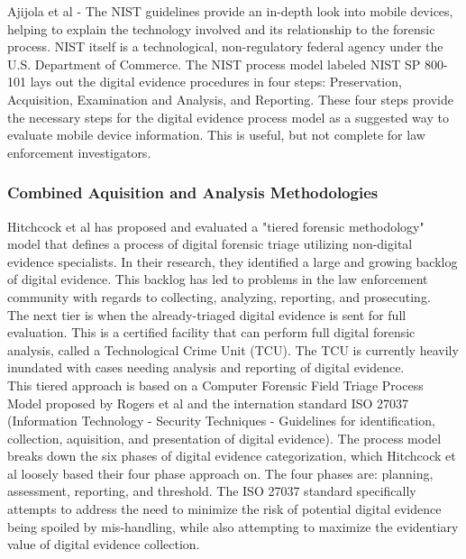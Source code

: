 \documentclass[12pt]{article}
\begin{document}
Ajijola et al\cite{ajijola2014review} - The NIST guidelines provide an in-depth look into mobile devices, helping to explain the technology involved and its
relationship to the forensic process.  NIST itself is a technological, non-regulatory federal agency under the U.S.
Department of Commerce.  The NIST process model labeled NIST SP 800-101 lays out the digital evidence procedures in
four steps: Preservation, Acquisition, Examination and Analysis, and Reporting.  These four steps provide the
necessary steps for the digital evidence process model as a suggested way to evaluate mobile device information.  This
is useful, but not complete for law enforcement investigators.\\

\subsubsection{Combined Aquisition and Analysis Methodologies}
Hitchcock et al\cite{hitchcock2016tiered} has proposed and evaluated a "tiered forensic methodology" model that defines
a process of digital forensic triage utilizing non-digital evidence specialists.  In their research, they identified
a large and growing backlog of digital evidence.  This backlog has led to problems in the law enforcement community
with regards to collecting, analyzing, reporting, and prosecuting.\\

The next tier is when the already-triaged digital evidence is sent for full evaluation.  This is a certified facility
that can perform full digital forensic analysis, called a Technological Crime Unit (TCU).  The TCU is currently
heavily inundated with cases needing analysis and reporting of digital evidence.\\

This tiered approach is based on a Computer Forensic Field Triage Process Model proposed by Rogers et al
\cite{rogers2006computer} and the internation standard ISO 27037 (Information Technology - Security Techniques - 
Guidelines for identification, collection, aquisition, and presentation of digital evidence). The process model 
breaks down the six phases of digital evidence categorization, which Hitchcock et al\cite{hitchcock2016tiered} loosely
based their four phase approach on.  The four phases are: planning, assessment, reporting, and threshold.  The ISO
27037 standard specifically attempts to address the need to minimize the risk of potential digital evidence being
spoiled by mis-handling, while also attempting to maximize the evidentiary value of digital evidence collection.\\
\end{document}
